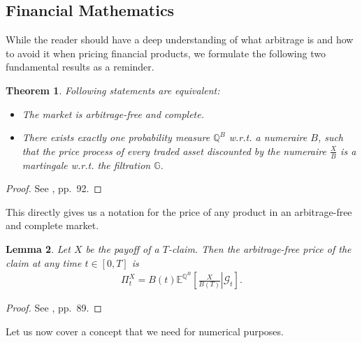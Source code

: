 \documentclass[12pt]{article}
\newtheorem{theorem}{Theorem}[section]
\newtheorem{lemma}[theorem]{Lemma}
\begin{document}
	\subsection{Financial Mathematics}
	While the reader should have a deep understanding of what arbitrage is and how to avoid it when pricing financial products, we formulate the following two fundamental results as a reminder.
	\begin{theorem}
		Following statements are equivalent:
		\begin{itemize}
			\item The market is arbitrage-free and complete.
			\item There exists exactly one probability measure $\mathbb{Q}^B$ w.r.t. a numeraire $B$, such that the price process of every traded asset discounted by the numeraire $\frac{X}{B}$ is a martingale w.r.t. the filtration $\mathbb{G}$.
		\end{itemize}
	\end{theorem}
	\begin{proof}
		See \cite{fima2Lecture}, pp.\ 92.
	\end{proof}
	This directly gives us a notation for the price of any product in an arbitrage-free and complete market.
	\begin{lemma}
		Let $X$ be the payoff of a $T$-claim. Then the arbitrage-free price of the claim at any time $t\in \left[0, T\right]$ is
		\begin{align*}
			\Pi^X_t = B(t)\mathbb{E}^{\mathbb{Q}^B}\left[\left.\frac{X}{B(T)} \right| \mathcal{G}_t\right].
		\end{align*}
	\end{lemma}
	\begin{proof}
		See \cite{fima2Lecture}, pp.\ 89.
	\end{proof}
	Let us now cover a concept that we need for numerical purposes.
	
	
\end{document}
